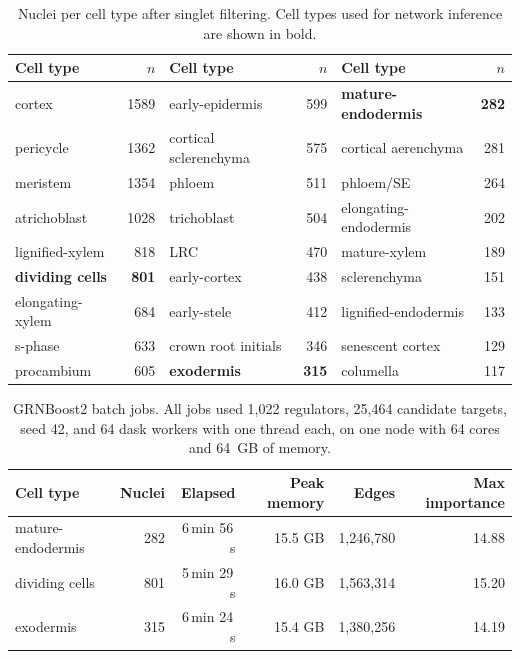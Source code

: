 \begin{table}[htbp]
\centering
\begin{singlespace}
\caption{Nuclei per cell type after singlet filtering. Cell types used for network inference are shown in bold.}
\label{tab:celltypes}
\small
\begin{tabular}{lr lr lr}
\toprule
Cell type & $n$ & Cell type & $n$ & Cell type & $n$ \\
\midrule
cortex & 1589 & early-epidermis & 599 & \textbf{mature-endodermis} & \textbf{282} \\
pericycle & 1362 & cortical sclerenchyma & 575 & cortical aerenchyma & 281 \\
meristem & 1354 & phloem & 511 & phloem/SE & 264 \\
atrichoblast & 1028 & trichoblast & 504 & elongating-endodermis & 202 \\
lignified-xylem & 818 & LRC & 470 & mature-xylem & 189 \\
\textbf{dividing cells} & \textbf{801} & early-cortex & 438 & sclerenchyma & 151 \\
elongating-xylem & 684 & early-stele & 412 & lignified-endodermis & 133 \\
s-phase & 633 & crown root initials & 346 & senescent cortex & 129 \\
procambium & 605 & \textbf{exodermis} & \textbf{315} & columella & 117 \\
\bottomrule
\end{tabular}
\end{singlespace}
\end{table}

\begin{table}[htbp]
\centering
\begin{singlespace}
\caption{GRNBoost2 batch jobs. All jobs used 1,022 regulators, 25,464 candidate targets, seed 42, and 64 dask workers with one thread each, on one node with 64 cores and 64~GB of memory.}
\label{tab:runs}
\small
\begin{tabular}{lrrrrr}
\toprule
Cell type & Nuclei & Elapsed & Peak memory & Edges & Max importance \\
\midrule
mature-endodermis & 282 & 6\,min 56\,s & 15.5 GB & 1,246,780 & 14.88 \\
dividing cells    & 801 & 5\,min 29\,s & 16.0 GB & 1,563,314 & 15.20 \\
exodermis         & 315 & 6\,min 24\,s & 15.4 GB & 1,380,256 & 14.19 \\
\bottomrule
\end{tabular}
\end{singlespace}
\end{table}

